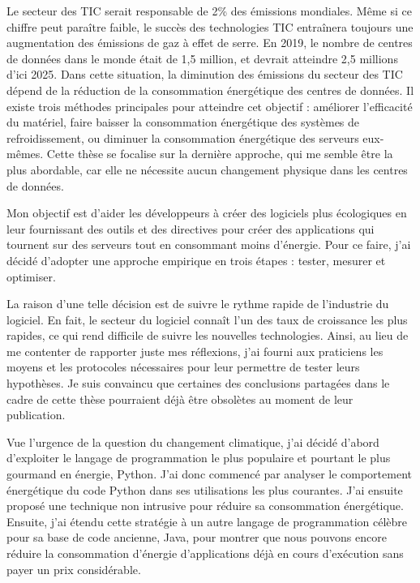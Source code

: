 \begin{abstract_fr}
Le secteur des TIC serait responsable de 2\% des émissions mondiales. Même si ce chiffre peut paraître faible, le succès des technologies TIC entraînera toujours une augmentation des émissions de gaz à effet de serre.
En 2019, le nombre de centres de données dans le monde était de 1,5 million, et devrait atteindre 2,5 millions d'ici 2025.
Dans cette situation, la diminution des émissions du secteur des TIC dépend de la réduction de la consommation énergétique des centres de données.
Il existe trois méthodes principales pour atteindre cet objectif : améliorer l'efficacité du matériel, faire baisser la consommation énergétique des systèmes de refroidissement, ou diminuer la consommation énergétique des serveurs eux-mêmes.
Cette thèse se focalise sur la dernière approche, qui me semble être la plus abordable, car elle ne nécessite aucun changement physique dans les centres de données.

Mon objectif est d'aider les développeurs à créer des logiciels plus écologiques en leur fournissant des outils et des directives pour créer des applications qui tournent sur des serveurs tout en consommant moins d'énergie.
Pour ce faire, j'ai décidé d'adopter une approche empirique en trois étapes : tester, mesurer et optimiser.

La raison d'une telle décision est de suivre le rythme rapide de l'industrie du logiciel. En fait, le secteur du logiciel connaît l'un des taux de croissance les plus rapides, ce qui rend difficile de suivre les nouvelles technologies. Ainsi, au lieu de me contenter de rapporter juste mes réflexions, j'ai fourni aux praticiens les moyens et les protocoles nécessaires pour leur permettre de tester leurs hypothèses. Je suis convaincu que certaines des conclusions partagées dans le cadre de cette thèse pourraient déjà être obsolètes au moment de leur publication. 

Vue l'urgence de la question du changement climatique, j'ai décidé d'abord d'exploiter le langage de programmation le plus populaire et pourtant le plus gourmand en énergie, Python.
 J'ai donc commencé par analyser le comportement énergétique du code Python dans ses utilisations les plus courantes.
 J'ai ensuite proposé une technique non intrusive pour réduire sa consommation énergétique.
 Ensuite, j'ai étendu cette stratégie à un autre langage de programmation célèbre pour sa base de code ancienne, Java, pour montrer que nous pouvons encore réduire la consommation d'énergie d'applications déjà en cours d'exécution sans payer un prix considérable.


\end{abstract_fr}
